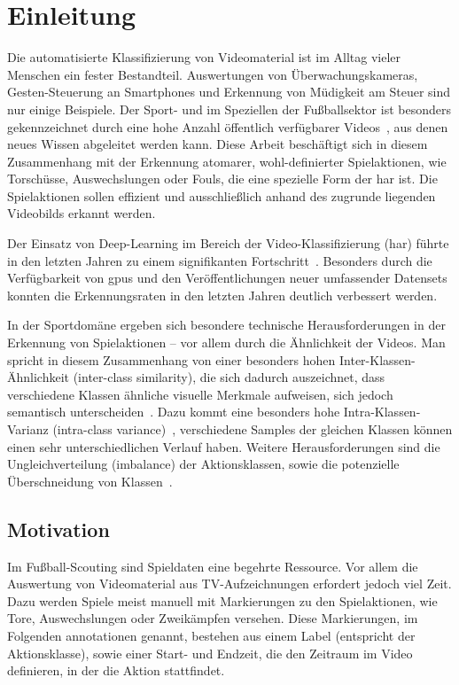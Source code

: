\chapter{Einleitung}
\label{ch:intro}

Die automatisierte Klassifizierung von Videomaterial ist im Alltag vieler Menschen ein fester Bestandteil.
Auswertungen von Überwachungskameras, Gesten-Steuerung an Smartphones und Erkennung von Müdigkeit am Steuer sind nur einige Beispiele.
Der Sport- und im Speziellen der Fußballsektor ist besonders gekennzeichnet durch eine hohe Anzahl öffentlich verfügbarer Videos~\cite{Giancola18}, aus denen neues Wissen abgeleitet werden kann.
Diese Arbeit beschäftigt sich in diesem Zusammenhang mit der Erkennung atomarer, wohl-definierter Spielaktionen, wie Torschüsse, Auswechslungen oder Fouls, die eine spezielle Form der \gls{har} ist.
Die Spielaktionen sollen effizient und ausschließlich anhand des zugrunde liegenden Videobilds erkannt werden.

Der Einsatz von Deep-Learning im Bereich der Video-Klassifizierung (\gls{har}) führte in den letzten Jahren zu einem signifikanten Fortschritt~\cite{Abu-Bakar19}.
Besonders durch die Verfügbarkeit von \glspl{gpu} und den Veröffentlichungen neuer umfassender Datensets konnten die Erkennungsraten in den letzten Jahren deutlich verbessert werden. %

In der Sportdomäne ergeben sich besondere technische Herausforderungen in der Erkennung von Spielaktionen -- vor allem durch die Ähnlichkeit der Videos.
Man spricht in diesem Zusammenhang von einer besonders hohen Inter-Klassen-Ähnlichkeit (inter-class similarity), die sich dadurch auszeichnet, dass verschiedene Klassen ähnliche visuelle Merkmale aufweisen, sich jedoch semantisch unterscheiden~\cite{Sozykin17}.
Dazu kommt eine besonders hohe Intra-Klassen-Varianz (intra-class variance)~\cite{Ballan09}, \dh verschiedene Samples der gleichen Klassen können einen sehr unterschiedlichen Verlauf haben.
Weitere Herausforderungen sind die Ungleichverteilung (imbalance) der Aktionsklassen, sowie die potenzielle Überschneidung von Klassen~\cite{Jiang19}.

\section{Motivation}
\label{sec:motivation}

Im Fußball-Scouting sind Spieldaten eine begehrte Ressource.
Vor allem die Auswertung von Videomaterial aus TV-Aufzeichnungen erfordert jedoch viel Zeit.
Dazu werden Spiele meist manuell mit Markierungen zu den Spielaktionen, wie Tore, Auswechslungen oder Zweikämpfen versehen.
Diese Markierungen, im Folgenden \gls{annotationen} genannt, bestehen aus einem Label (entspricht der Aktionsklasse), sowie einer Start- und Endzeit, die den Zeitraum im Video definieren, in der die Aktion stattfindet.


